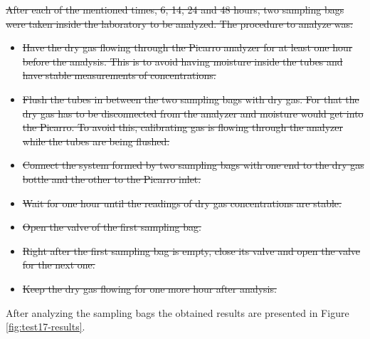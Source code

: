 \documentclass[a4paper,12pt,twoside]{article}
\providecommand{\DIFdeltex}[1]{{\protect\color{red}\sout{#1}}}                      %
\providecommand{\DIFdelend}{} %
\providecommand{\DIFdel}[1]{\texorpdfstring{\DIFdeltex{#1}}{}} %
\DeclareRobustCommand{\DIFdelend}{\DIFOaddend \let\includegraphics\DIFOincludegraphics} %
\begin{document}
\DIFdel{After each of the mentioned times, 6, 14, 24 and 48 hours, two sampling bags were taken inside the laboratory to be analyzed. The procedure to analyze was: 
}%
\begin{itemize}%
\item%
\DIFdel{Have the dry gas flowing through the Picarro analyzer for at least one hour before the analysis. This is to avoid having moisture inside the tubes and have stable measurements of concentrations.
    }%
\item%
\DIFdel{Flush the tubes in between the two sampling bags with dry gas. For that the dry gas has to be disconnected from the analyzer and moisture would get into the Picarro. To avoid this, calibrating gas is flowing through the analyzer while the tubes are being flushed.
    }%
\item%
\DIFdel{Connect the system formed by two sampling bags with one end to the dry gas bottle and the other to the Picarro inlet.
    }%
\item%
\DIFdel{Wait for one hour until the readings of dry gas concentrations are stable. 
    }%
\item%
\DIFdel{Open the valve of the first sampling bag. 
    }%
\item%
\DIFdel{Right after the first sampling bag is empty, close its valve and open the valve for the next one. 
    }%
\item%
\DIFdel{Keep the dry gas flowing for one more hour after analysis. 
}
\end{itemize}%

\DIFdelend After analyzing the sampling bags the obtained results are presented in Figure \ref{fig:test17-results}.
\end{document}
